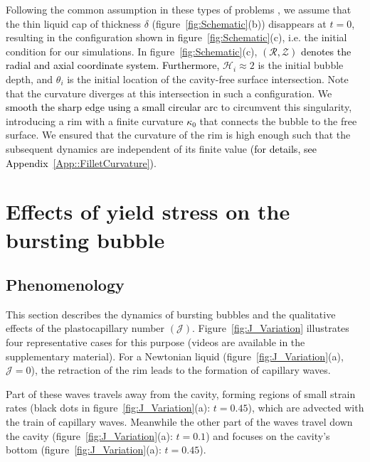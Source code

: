 \documentclass[final]{jfm}
\newcommand*\red{\textcolor{black}}
\begin{document}
Following the common assumption in these types of problems \citep{deike2018dynamics, gordillo2019capillary}, we assume that the thin liquid cap of thickness $\delta$ (figure~\ref{fig:Schematic}(b)) disappears at $t = 0$, resulting in the configuration shown in figure~\ref{fig:Schematic}(c), i.e. the initial condition for our simulations. In figure~\ref{fig:Schematic}(c), \red{$\left(\mathcal{R}, \mathcal{Z}\right)$ denotes the radial and axial coordinate system. Furthermore, }$\mathcal{H}_i \approx 2$ is the initial bubble depth, and $\theta_i$ is the initial location of the cavity-free surface intersection. Note that the curvature diverges at this intersection in such a configuration. We \red{smooth the sharp edge using a small circular arc} to circumvent this singularity, introducing a rim with a finite curvature \red{$\kappa_0$} that connects the bubble to the free surface. We ensured that the curvature of the rim is high enough such that the subsequent dynamics are independent of its finite value \red{(for details, see Appendix~\ref{App::FilletCurvature})}.

\section{Effects of yield stress on the bursting bubble}\label{Sec::Phenomenological}
\subsection{Phenomenology}\label{Sec::Phenomenological1}
This section describes the dynamics of bursting bubbles and the qualitative effects of the plastocapillary number $\left(\mathcal{J}\right)$. Figure~\ref{fig:J_Variation} illustrates four representative cases for this purpose (videos are available in the supplementary material). For a Newtonian liquid (figure~\ref{fig:J_Variation}(a), $\mathcal{J} = 0$), the retraction of the rim leads to the formation of capillary waves. 


Part of these waves travels away from the cavity, forming regions of small strain rates (black dots in figure~\ref{fig:J_Variation}(a): $t = 0.45$), which are advected with the train of capillary waves. 
Meanwhile the other part of the waves travel down the cavity (figure~\ref{fig:J_Variation}(a): $t = 0.1$) and focuses on the cavity's bottom (figure~\ref{fig:J_Variation}(a): $t = 0.45$). 
\end{document}
